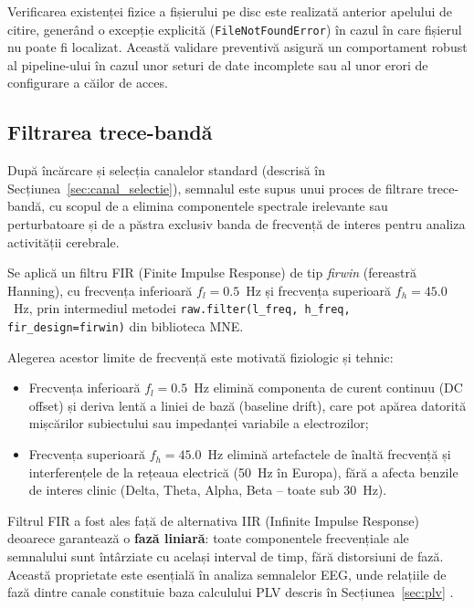 \documentclass[12pt,a4paper]{report}
\theoremstyle{definition}
\theoremstyle{remark}
\begin{document}
Verificarea existenței fizice a fișierului pe disc este realizată anterior apelului de citire, generând o excepție explicită (\texttt{FileNotFoundError}) în cazul în care fișierul nu poate fi localizat. Această validare preventivă asigură un comportament robust al pipeline-ului în cazul unor seturi de date incomplete sau al unor erori de configurare a căilor de acces.

\subsection{Filtrarea trece-bandă}

După încărcare și selecția canalelor standard (descrisă în Secțiunea~\ref{sec:canal_selectie}), semnalul este supus unui proces de filtrare trece-bandă, cu scopul de a elimina componentele spectrale irelevante sau perturbatoare și de a păstra exclusiv banda de frecvență de interes pentru analiza activității cerebrale.

Se aplică un filtru FIR (Finite Impulse Response) de tip \textit{firwin} (fereastră Hanning), cu frecvența inferioară $f_l = 0.5$~Hz și frecvența superioară $f_h = 45.0$~Hz, prin intermediul metodei \texttt{raw.filter(l\_freq, h\_freq, fir\_design=\textquotedbl firwin\textquotedbl)} din biblioteca MNE.

Alegerea acestor limite de frecvență este motivată fiziologic și tehnic:
\begin{itemize}
    \item Frecvența inferioară $f_l = 0.5$~Hz elimină componenta de curent continuu (DC offset) și deriva lentă a liniei de bază (baseline drift), care pot apărea datorită mișcărilor subiectului sau impedanței variabile a electrozilor;
    \item Frecvența superioară $f_h = 45.0$~Hz elimină artefactele de înaltă frecvență și interferențele de la rețeaua electrică (50~Hz în Europa), fără a afecta benzile de interes clinic (Delta, Theta, Alpha, Beta -- toate sub 30~Hz).
\end{itemize}

Filtrul FIR a fost ales față de alternativa IIR (Infinite Impulse Response) deoarece garantează o \textbf{fază liniară}: toate componentele frecvențiale ale semnalului sunt întârziate cu același interval de timp, fără distorsiuni de fază. Această proprietate este esențială în analiza semnalelor EEG, unde relațiile de fază dintre canale constituie baza calculului PLV descris în Secțiunea~\ref{sec:plv} \cite{awais2024graphical,rahman2025advancement}.
\end{document}
